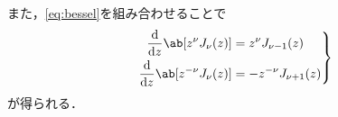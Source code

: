 また，\eqref{eq:bessel}を組み合わせることで
\begin{gather}
  \left.
    \begin{aligned}
      \diff**{z}{\ab[z^\nu J_\nu(z)]} & = z^\nu J_{\nu-1}(z)\\
      \diff**{z}{\ab[z^{-\nu} J_{\nu}(z)]} & = -z^{-\nu} J_{\nu+1}(z)
    \end{aligned}
  \right\}
\end{gather}
が得られる．

